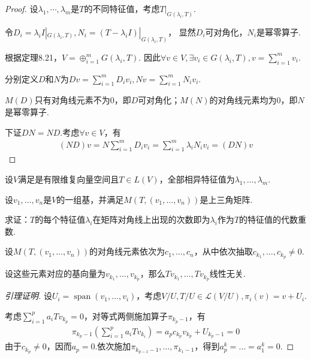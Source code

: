 \begin{proof}
    设\(\lambda_1,\cdots,\lambda_m\)是\(T\)的不同特征值，考虑\(T|_{G(\lambda_i,T)}\).

    令\(D_i=\lambda_i I|_{G(\lambda_i,T)},N_i=(T-\lambda_i I)|_{G(\lambda_i,T)}\)，
    显然\(D_i\)可对角化，\(N_i\)是幂零算子.
    
    根据定理8.21，\(V=\oplus_{i=1}^m G(\lambda_i,T)\).
    因此\(\forall v \in V,\exists v_i \in G(\lambda_i,T),v=\sum_{i=1}^m v_i\).
    
    分别定义\(D\)和\(N\)为\(Dv=\sum_{i=1}^m D_iv_i,Nv=\sum_{i=1}^m N_iv_i\).
    
    \(M(D)\)只有对角线元素不为\(0\)，即\(D\)可对角化；\(M(N)\)的对角线元素均为\(0\)，即\(N\)是幂零算子.
    
    下证\(DN=ND\).考虑\(\forall v \in V\)，有
        \begin{align*}
            (ND)v=N\sum_{i=1}^m D_iv_i=\sum_{i=1}^m \lambda_iN_iv_i=(DN)v
        \end{align*}
\end{proof}

\begin{problem}[11]\label{8.B.11}
    设\(V\)满足是有限维复向量空间且\(T \in L(V)\)，全部相异特征值为\(\lambda_1, \dots, \lambda_m\).

    设\(v_1, \dots, v_n\)是\(V\)的一组基，并满足\(M(T,(v_1, \dots, v_n))\)是上三角矩阵.
    
    求证：\(T\)的每个特征值\(\lambda_i\)在矩阵对角线上出现的次数即为\(\lambda_i\)作为\(T\)的特征值的代数重数.
\end{problem}

\begin{lemma}
    设\(M(T,(v_1, \dots, v_n))\)的对角线元素依次为\(c_1, \dots, c_n\)，从中依次抽取\(c_{k_1}, \dots, c_{k_p} \ne 0\).

    设这些元素对应的基向量为\(v_{k_1}, \dots, v_{k_p}\)，那么\(Tv_{k_1}, \dots, Tv_{k_p}\)线性无关.
\end{lemma}

\begin{proof}[引理证明]
    设\(U_i=\operatorname{span}(v_1, \dots, v_i)\)，考虑\(V/U, T/U \in \mathcal{L}(V/U), \pi_i(v)=v+U_i\).

    考虑\(\sum_{i=1}^p a_iTv_{k_p}=0\)，对等式两侧施加算子\(\pi_{k_p-1}\)，有
    \begin{align*}
        \pi_{k_p-1}(\sum_{i=1}^p a_iTv_{k_i})=a_pc_{k_p}v_{k_p}+U_{k_p-1}=0
    \end{align*}
    由于\(c_{k_p} \ne 0\)，因而\(a_p=0\).依次施加\(\pi_{k_{p-1}-1}, \dots, \pi_{k_1-1}\)，得到\(a_p^k=\dots=a_1^k=0\).
\end{proof}

